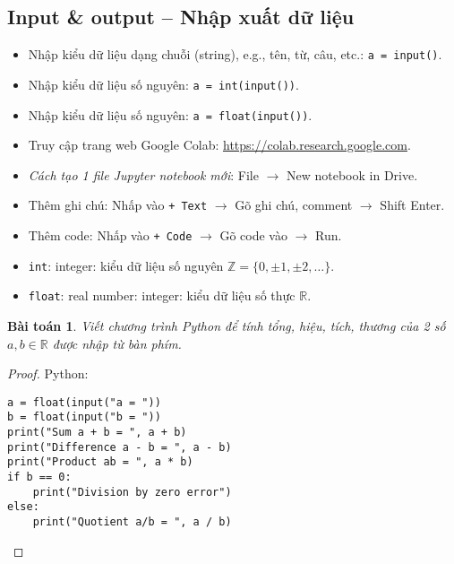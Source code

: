 \documentclass{article}
\newtheorem{baitoan}{Bài toán}
\begin{document}

\subsection{Input \& output -- Nhập xuất dữ liệu}

\begin{itemize}
	\item Nhập kiểu dữ liệu dạng chuỗi (string), e.g., tên, từ, câu, etc.: {\tt a = input()}.
	\item Nhập kiểu dữ liệu số nguyên:  {\tt a = int(input())}.
	\item Nhập kiểu dữ liệu số nguyên:  {\tt a = float(input())}.
\end{itemize}

\begin{itemize}
	\item Truy cập trang web Google Colab: \url{https://colab.research.google.com}.
	\item {\it Cách tạo 1 file Jupyter notebook mới}: File $\to$ New notebook in Drive.
	\item Thêm ghi chú: Nhấp vào {\tt+ Text} $\to$ Gõ ghi chú, comment $\to$ Shift Enter.
	\item Thêm code: Nhấp vào {\tt+ Code} $\to$ Gõ code vào $\to$ Run.
\end{itemize}

\begin{itemize}
	\item {\tt int}: integer: kiểu dữ liệu số nguyên $\mathbb{Z} = \{0,\pm1,\pm2,\ldots\}$.
	\item {\tt float}: real number: integer: kiểu dữ liệu số thực $\mathbb{R}$.
\end{itemize}

\begin{baitoan}
	Viết chương trình Python để tính tổng, hiệu, tích, thương của 2 số $a,b\in\mathbb{R}$ được nhập từ bàn phím.
\end{baitoan}

\begin{proof}
	Python:
	\begin{verbatim}
a = float(input("a = "))
b = float(input("b = "))
print("Sum a + b = ", a + b)
print("Difference a - b = ", a - b)
print("Product ab = ", a * b)
if b == 0:
    print("Division by zero error")
else:
    print("Quotient a/b = ", a / b)
	\end{verbatim}
\end{proof}
\end{document}
